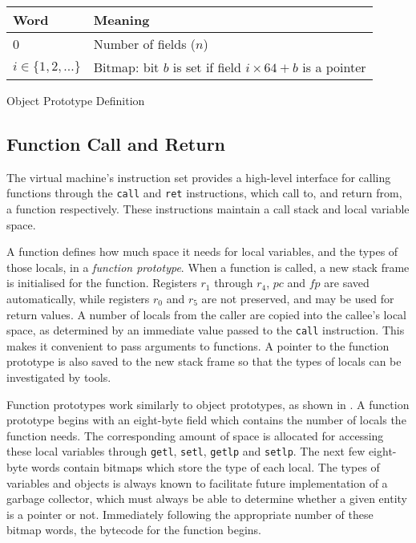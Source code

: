 		\begin{myfigure}
			\begin{tabular}{|l|l| }
				\hline
				Word & Meaning \\
				\hline
				0 & Number of fields ($n$) \\
				\hline
				$i \in \{1, 2, ...\}$ & Bitmap: bit $b$ is set if field $i\times64 + b$ is a pointer \\
				\hline
			\end{tabular}
			\caption{Object Prototype Definition}
			\label{fig:objproto}
		\end{myfigure}
		
		\subsection{Function Call and Return}
		The virtual machine's instruction set provides a high-level interface for calling functions through the \texttt{call} and \texttt{ret} instructions, which call to, and return from, a function respectively. These instructions maintain a call stack and local variable space.
		
		A function defines how much space it needs for local variables, and the types of those locals, in a \emph{function prototype}. When a function is called, a new stack frame is initialised for the function. Registers $r_1$ through $r_4$, $pc$ and $fp$ are saved automatically, while registers $r_0$ and $r_5$ are not preserved, and may be used for return values. A number of locals from the caller are copied into the callee's local space, as determined by an immediate value passed to the \texttt{call} instruction. This makes it convenient to pass arguments to functions. A pointer to the function prototype is also saved to the new stack frame so that the types of locals can be investigated by tools.
		
		Function prototypes work similarly to object prototypes, as shown in . A function prototype begins with an eight-byte field which contains the number of locals the function needs. The corresponding amount of space is allocated for accessing these local variables through \texttt{getl}, \texttt{setl}, \texttt{getlp} and \texttt{setlp}. The next few eight-byte words contain bitmaps which store the type of each local. The types of variables and objects is always known to facilitate future implementation of a garbage collector, which must always be able to determine whether a given entity is a pointer or not. Immediately following the appropriate number of these bitmap words, the bytecode for the function begins.
		
